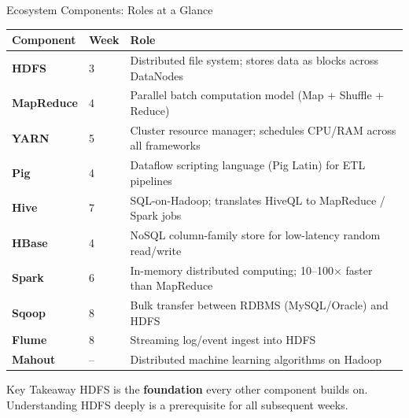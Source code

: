 \documentclass[aspectratio=169,10pt]{beamer}
\begin{document}
\begin{frame}{Ecosystem Components: Roles at a Glance}
  \centering
  \renewcommand{\arraystretch}{1.38}
  \begin{tabular}{p{1.8cm}p{1.5cm}p{7.0cm}}
    \toprule
    \textbf{Component} & \textbf{Week} & \textbf{Role} \\
    \midrule
    \textbf{HDFS}      & 3 & Distributed file system; stores data as blocks across DataNodes \\
    \textbf{MapReduce} & 4 & Parallel batch computation model (Map + Shuffle + Reduce) \\
    \textbf{YARN}      & 5 & Cluster resource manager; schedules CPU/RAM across all frameworks \\
    \textbf{Pig}       & 4 & Dataflow scripting language (Pig Latin) for ETL pipelines \\
    \textbf{Hive}      & 7 & SQL-on-Hadoop; translates HiveQL to MapReduce / Spark jobs \\
    \textbf{HBase}     & 4 & NoSQL column-family store for low-latency random read/write \\
    \textbf{Spark}     & 6 & In-memory distributed computing; 10--100$\times$ faster than MapReduce \\
    \textbf{Sqoop}     & 8 & Bulk transfer between RDBMS (MySQL/Oracle) and HDFS \\
    \textbf{Flume}     & 8 & Streaming log/event ingest into HDFS \\
    \textbf{Mahout}    & -- & Distributed machine learning algorithms on Hadoop \\
    \bottomrule
  \end{tabular}
  \vspace{6pt}
  \begin{block}{Key Takeaway}
    HDFS is the \textbf{foundation} every other component builds on.  Understanding HDFS deeply is a prerequisite for all subsequent weeks.
  \end{block}
\end{frame}
\end{document}
